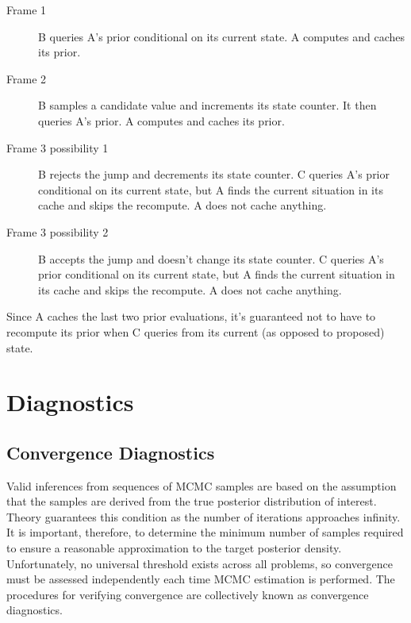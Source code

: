 \documentclass[]{book}
\begin{document}
\begin{description}
\item[Frame 1] B queries A's prior conditional on its current state. A computes and caches its prior.
\begin{center}
\end{center}

\item[Frame 2] B samples a candidate value and increments its state counter. It then queries A's prior. A computes and caches its prior.
\begin{center}
\end{center}

\item[Frame 3 possibility 1] B rejects the jump and decrements its state counter. C queries A's prior conditional on its current state, but A finds the current situation in its cache and skips the recompute. A does not cache anything.
\begin{center}
\end{center}

\item[Frame 3 possibility 2] B accepts the jump and doesn't change its state counter. C queries A's prior conditional on its current state, but A finds the current situation in its cache and skips the recompute. A does not cache anything.
\begin{center}
\end{center}

\end{description}

Since A caches the last two prior evaluations, it's guaranteed not to have to recompute its prior when C queries from its current (as opposed to proposed) state.



\chapter{Diagnostics} %

\section{Convergence Diagnostics} 

Valid inferences from sequences of MCMC samples are based on the assumption that the samples are derived from the true posterior distribution of interest. Theory guarantees this condition as the number of iterations approaches infinity. It is important, therefore, to determine the minimum number of samples required to ensure a reasonable approximation to the target posterior density. Unfortunately, no universal threshold exists across all problems, so convergence must be assessed independently each time MCMC estimation is performed. The procedures for verifying convergence are collectively known as convergence diagnostics.
\end{document}
